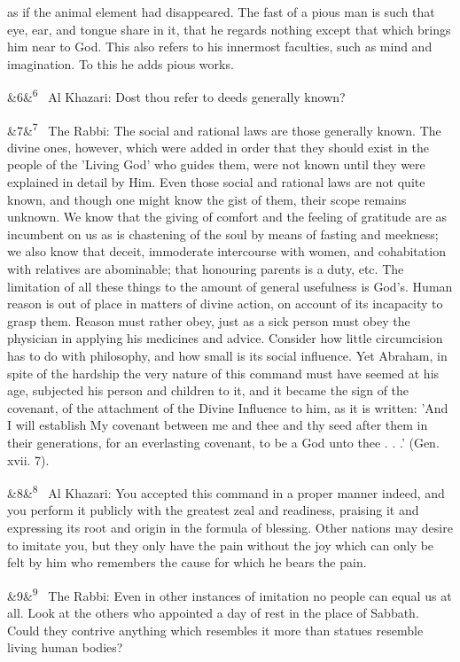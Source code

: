 \documentclass[12pt]{article}
\newcommand{\para}[1][]{\par\noindent\ifx&#1&\else\textsuperscript{\footnotesize #1}~\fi}
\begin{document}
as if the animal element had disappeared. The fast of a pious man is such that eye, ear, and tongue share in it, that he regards nothing except that which brings him near to God. This also refers to his innermost faculties, such as mind and imagination. To this he adds pious works.

\para[6] Al Khazari: Dost thou refer to deeds generally known?

\para[7] The Rabbi: The social and rational laws are those generally known. The divine ones, however, which were added in order that they should exist in the people of the 'Living God' who guides them, were not known until they were explained in detail by Him. Even those social and rational laws are not quite known, and though one might know the gist of them, their scope remains unknown. We know that the giving of comfort and the feeling of gratitude are as incumbent on us as is chastening of the soul by means of fasting and meekness; we also know that deceit, immoderate intercourse with women, and cohabitation with relatives are abominable; that honouring parents is a duty, etc. The limitation of all these things to the amount of general usefulness is God's. Human reason is out of place in matters of divine action, on account of its incapacity to grasp them. Reason must rather obey, just as a sick person must obey the physician in applying his medicines and advice. Consider how little circumcision has to do with philosophy, and how small is its social influence. Yet Abraham, in spite of the hardship the very nature of this command must have seemed at his age, subjected his person and children to it, and it became the sign of the covenant, of the attachment of the Divine Influence to him, as it is written: 'And I will establish My covenant between me and thee and thy seed after them in their generations, for an everlasting covenant, to be a God unto thee . . .' (Gen. xvii. 7).

\para[8] Al Khazari: You accepted this command in a proper manner indeed, and you perform it publicly with the greatest zeal and readiness, praising it and expressing its root and origin in the formula of blessing. Other nations may desire to imitate you, but they only have the pain without the joy which can only be felt by him who remembers the cause for which he bears the pain.

\para[9] The Rabbi: Even in other instances of imitation no people can equal us at all. Look at the others who appointed a day of rest in the place of Sabbath. Could they contrive anything which resembles it more than statues resemble living human bodies?
\end{document}
